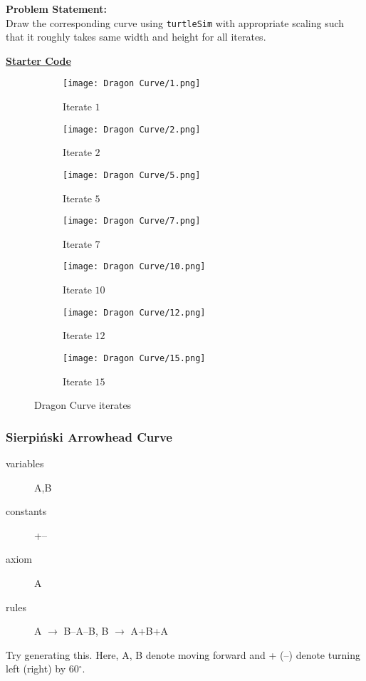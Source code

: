 \documentclass[../../Problems]{subfiles}
\begin{document}
\textbf{Problem Statement:}\\
Draw the corresponding curve using \verb!turtleSim! with appropriate scaling such that it roughly takes same width and height for all iterates.
\begin{tcolorbox}%
	\href{https://github.com/paramrathour/CS-101/tree/main/Starter Codes/Dragon Curve.cpp}{\textbf{Starter Code}}
\end{tcolorbox}
\begin{figure}[H]
	\centering
	\begin{subfigure}{0.1\linewidth}
		\texttt{[image: Dragon Curve/1.png]}
		\caption{Iterate $1$}
	\end{subfigure}
	\begin{subfigure}{0.08\linewidth}
		\texttt{[image: Dragon Curve/2.png]}
		\caption{Iterate $2$}
	\end{subfigure}
	\begin{subfigure}{0.12\linewidth}
		\texttt{[image: Dragon Curve/5.png]}
		\caption{Iterate $5$}
	\end{subfigure}
	\begin{subfigure}{0.16\linewidth}
		\texttt{[image: Dragon Curve/7.png]}
		\caption{Iterate $7$}
	\end{subfigure}
	\begin{subfigure}{0.09\linewidth}
		\texttt{[image: Dragon Curve/10.png]}
		\caption{Iterate $10$}
	\end{subfigure}
	\begin{subfigure}{0.18\linewidth}
		\texttt{[image: Dragon Curve/12.png]}
		\caption{Iterate $12$}
	\end{subfigure}
	\begin{subfigure}{0.18\linewidth}
		\texttt{[image: Dragon Curve/15.png]}
		\caption{Iterate $15$}
	\end{subfigure}
	\caption{Dragon Curve iterates}
\end{figure}
\vspace{-2em}
\subsubsection{Sierpi\'nski Arrowhead Curve}{\label{pp:sierpinskicurve}}
\begin{description}
	\item[variables] A,B
	\item[constants] +--
	\item[axiom] A
	\item[rules] A $\rightarrow$ B--A--B, B $\rightarrow$ A+B+A
\end{description}
Try generating this. Here, A, B denote moving forward and + (--) denote turning left (right) by 60$^\circ$.
\end{document}
